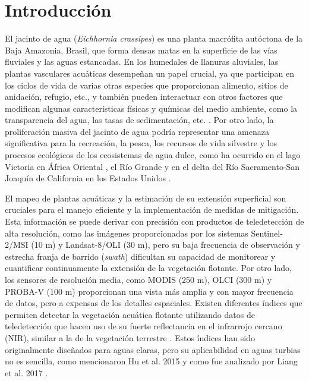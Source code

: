 \section{Introducción}
\label{cam:s:introduccion}

    El jacinto de agua (\textit{Eichhornia crassipes}) es una planta macrófita autóctona de la Baja Amazonia, Brasil, que forma densas matas en la superficie de las vías fluviales y las aguas estancadas. En los humedales de llanuras aluviales, las plantas vasculares acuáticas desempeñan un papel crucial, ya que participan en los ciclos de vida de varias otras especies que proporcionan alimento, sitios de anidación, refugio, etc., y también pueden interactuar con otros factores que modifican algunas características físicas y químicas del medio ambiente, como la transparencia del agua, las tasas de sedimentación, etc. \cite{marchetti2013}. Por otro lado, la proliferación masiva del jacinto de agua podría representar una amenaza significativa para la recreación, la pesca, los recursos de vida silvestre y los procesos ecológicos de los ecosistemas de agua dulce, como ha ocurrido en el lago Victoria en África Oriental \cite{fusilli2013}, el Río Grande \cite{everitt2003} y en el delta del Río Sacramento-San Joaquín de California en los Estados Unidos \cite{cohen1998}.
    
    El mapeo de plantas acuáticas y la estimación de su extensión superficial son cruciales para el manejo eficiente y la implementación de medidas de mitigación. Esta información se puede derivar con precisión con productos de teledetección de alta resolución, como las imágenes proporcionadas por los sistemas Sentinel-2/MSI (10 m) y Landsat-8/OLI (30 m), pero su baja frecuencia de observación y  estrecha franja de barrido (\textit{swath}) dificultan su capacidad de monitorear y cuantificar continuamente la extensión de la vegetación flotante. Por otro lado, los sensores de resolución media, como MODIS (250 m), OLCI (300 m) y PROBA-V (100 m) proporcionan una vista más amplia y con mayor frecuencia de datos, pero a expensas de los detalles espaciales. Existen diferentes índices que permiten detectar la vegetación acuática flotante utilizando datos de teledetección que hacen uso de su fuerte reflectancia en el infrarrojo cercano (NIR), similar a la de la vegetación terrestre \cite{gower2008}\cite{hu2009}\cite{shi2009}\cite{keesing2011}\cite{alawadi2010}\cite{xing2016}\cite{hu2017}. Estos índices han sido originalmente diseñados para aguas claras, pero su aplicabilidad en aguas turbias no es sencilla, como mencionaron Hu et al. 2015 \cite{hu2015} y como fue analizado por Liang et al. 2017 \cite{liang2017}.
    
